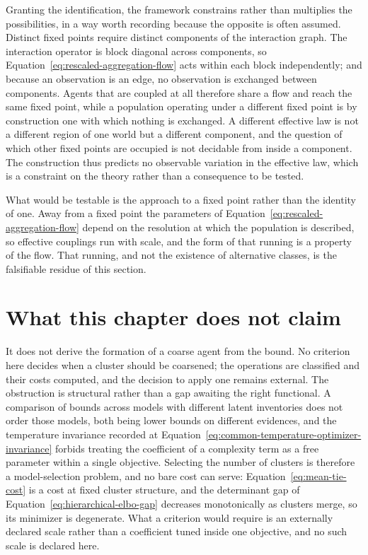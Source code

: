 Granting the identification, the framework constrains rather than multiplies the possibilities, in a way worth recording because the opposite is often assumed. Distinct fixed points require distinct components of the interaction graph. The interaction operator is block diagonal across components, so Equation~\eqref{eq:rescaled-aggregation-flow} acts within each block independently; and because an observation is an edge, no observation is exchanged between components. Agents that are coupled at all therefore share a flow and reach the same fixed point, while a population operating under a different fixed point is by construction one with which nothing is exchanged. A different effective law is not a different region of one world but a different component, and the question of which other fixed points are occupied is not decidable from inside a component. The construction thus predicts no observable variation in the effective law, which is a constraint on the theory rather than a consequence to be tested.

What would be testable is the approach to a fixed point rather than the identity of one. Away from a fixed point the parameters of Equation~\eqref{eq:rescaled-aggregation-flow} depend on the resolution at which the population is described, so effective couplings run with scale, and the form of that running is a property of the flow. That running, and not the existence of alternative classes, is the falsifiable residue of this section.

\section{What this chapter does not claim}

It does not derive the formation of a coarse agent from the bound. No criterion here decides when a cluster should be coarsened; the operations are classified and their costs computed, and the decision to apply one remains external. The obstruction is structural rather than a gap awaiting the right functional. A comparison of bounds across models with different latent inventories does not order those models, both being lower bounds on different evidences, and the temperature invariance recorded at Equation~\eqref{eq:common-temperature-optimizer-invariance} forbids treating the coefficient of a complexity term as a free parameter within a single objective. Selecting the number of clusters is therefore a model-selection problem, and no bare cost can serve: Equation~\eqref{eq:mean-tie-cost} is a cost at fixed cluster structure, and the determinant gap of Equation~\eqref{eq:hierarchical-elbo-gap} decreases monotonically as clusters merge, so its minimizer is degenerate. What a criterion would require is an externally declared scale rather than a coefficient tuned inside one objective, and no such scale is declared here.

